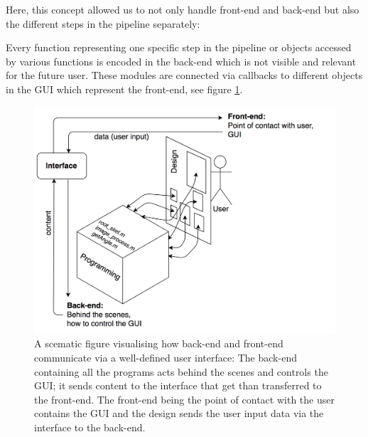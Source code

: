 
Here, this concept allowed us to not only handle front-end and back-end but also the different steps in the pipeline separately: 

Every function representing one specific step in the pipeline or objects accessed by various functions is encoded in the back-end which is not visible and relevant for the future user. These modules are connected via callbacks to different objects in the GUI which represent the front-end, see figure \ref{fig:fronendBackend}.


\begin{figure}[H]
	\centering
	\includegraphics[width=1.\textwidth]{../Figures/frontBack.png}
	\caption{A scematic figure visualising how back-end and front-end communicate via a well-defined user interface: The back-end containing all the programs acts behind the scenes and controls the GUI; it sends content to the interface that get than transferred to the front-end. The front-end being the point of contact with the user contains the GUI and the design sends the user input data via the interface to the back-end.}
	\label{fig:fronendBackend}
\end{figure}


